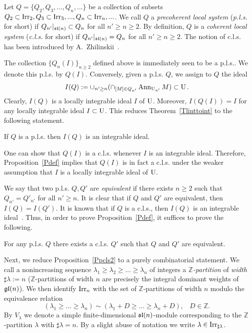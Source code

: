 \documentclass[10pt]{amsart}\oddsidemargin -1mm \evensidemargin -1mm \topmargin -15mm\headheight5mm \headsep 3.5mm \textheight 245mm\textwidth 170mm %
\begin{document}
Let $Q=\{Q_2, Q_3,..., Q_n,...\}$ be a collection of subsets $Q_2\subset \operatorname{\mathrm{Irr}}_2, Q_3\subset\operatorname{\mathrm{Irr}}_3,..., Q_n\subset\operatorname{\mathrm{Irr}}_n,...$. We call $Q$ a {\it precoherent local system} ({\it p.l.s.} for short) if $Q_{n'}|_{\frak{sl}(n)}\subset Q_n$ for all $n'\ge n\ge 2$. By definition, $Q$ is a {\it coherent local system} ({\it c.l.s.} for short) if $Q_{n'}|_{\frak{sl}(n)}=Q_n$ for all $n'\ge n\ge 2$. The notion of c.l.s. has been introduced by A.~Zhilinskii~\cite{Zh1}.

The collection $\{Q_n(I)\}_{n\ge2}$ defined above is immediately seen to be a p.l.s.. We denote this p.l.s. by $Q(I)$. Conversely,
given a p.l.s. $Q$, we assign to $Q$ the ideal
$$I(Q):=\cup_{n'\ge n}(\cap_{[M]\in Q_{n'}}\operatorname{\mathrm{Ann}}_{\operatorname{\mathrm{U}}_{n'}}M)\subset\operatorname{\mathrm{U}}.$$
Clearly, $I(Q)$ is a locally integrable ideal $I$ of $\operatorname{\mathrm{U}}$. Moreover, $I(Q(I))=I$ for any locally integrable ideal $I\subset\operatorname{\mathrm{U}}$. This reduces Theorem~\ref{Tlinttoint} to the following statement.
\begin{proposition}\label{Pdef}If $Q$ is a p.l.s. then $I(Q)$ is an integrable ideal.\end{proposition}
\begin{remark}One can show that $Q(I)$ is a c.l.s. whenever $I$ is an integrable ideal. Therefore, Proposition~\ref{Pdef} implies that $Q(I)$ is in fact a c.l.s. under the weaker assumption that $I$ is a locally integrable ideal of $\operatorname{\mathrm{U}}$.\end{remark}

We say that two p.l.s. $Q, Q'$ are {\it equivalent} if there exists $n\ge 2$ such that $Q_{n'}=Q'_{n'}$ for all $n'\ge n$. It is clear that if $Q$ and $Q'$ are equivalent, then $I(Q)=I(Q')$. It is known that if $Q$ is a c.l.s., then $I(Q)$ is an integrable ideal~\cite{PP1}. Thus, in order to prove Proposition~\ref{Pdef}, it suffices to prove the following.
\begin{proposition}\label{Ppcls2}For any p.l.s. $Q$ there exists a c.l.s. $Q'$ such that $Q$ and $Q'$ are equivalent.\end{proposition}
Next, we reduce Proposition~\ref{Ppcls2} to a purely combinatorial statement. We call a nonincreasing sequence $\lambda_1\ge\lambda_2\ge...\ge\lambda_n$ of integers a {\it $\mathbb Z$-partition} of {\it width} $\sharp\lambda:=n$ ($\mathbb Z$-partitions of width $n$ are precisely the integral dominant weights of $\frak{gl}(n)$). We then identify $\operatorname{\mathrm{Irr}}_n$ with the set of $\mathbb Z$-partitions of width $n$ modulo the equivalence relation $$(\lambda_1\ge ...\ge \lambda_n)\sim(\lambda_1+D\ge...\ge\lambda_n+D), \hspace{10pt}D\in\mathbb Z.$$
By $V_\lambda$ we denote a simple finite-dimensional $\frak{sl}(n)$-module corresponding to the $\mathbb Z$-partition $\lambda$ with $\sharp\lambda=n$. By a slight abuse of notation we write $\lambda\in\operatorname{\mathrm{Irr}}_{\sharp\lambda}$.
\end{document}
